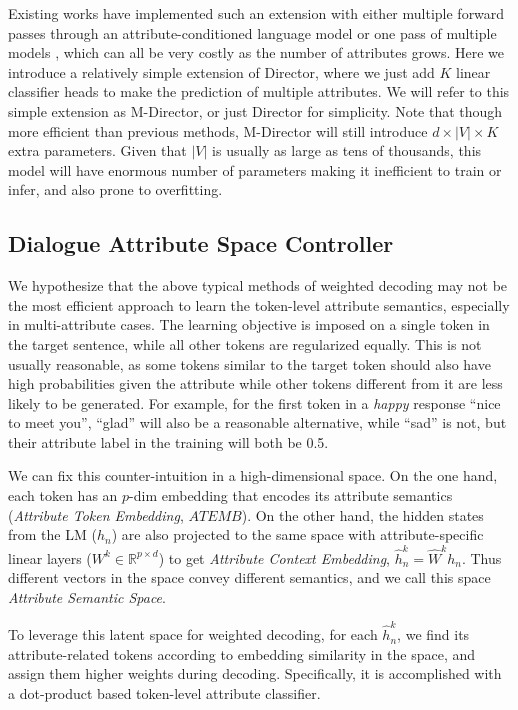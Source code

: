 Existing works have implemented such an extension with either multiple forward passes through an 
attribute-conditioned language model \citep{lin2021plug} or one pass 
of multiple models \citep{liu2021dexperts}, which can all be very costly as the number of attributes grows. 
Here we introduce a relatively simple extension of Director, where we just add $K$ linear classifier heads to 
make the prediction of multiple attributes. We will refer to this 
simple extension as M-Director, or just Director for simplicity.
Note that though more efficient than previous methods, M-Director will still introduce $d \times |V| \times K$ extra parameters.
Given that $|V|$ is usually as large as tens of thousands, this model will 
have enormous number of parameters making it inefficient to train or infer, 
and also prone to overfitting. 

\subsection{Dialogue Attribute Space Controller}
\label{sec:dasc_method}
We hypothesize that the above typical methods of weighted decoding may 
not be the most efficient approach to learn the token-level attribute 
semantics, especially in multi-attribute cases. 
The learning objective is imposed on a single token in the target sentence, 
while all  other tokens are regularized equally. This is not usually reasonable, as some tokens similar to the target token should also have high probabilities 
given the attribute while other tokens different from it are less likely to be 
generated. For example, for the first token in a \textit{happy} response ``nice to meet you'', ``glad'' will also be a reasonable alternative, 
while ``sad'' is not, but their attribute label in the training will both 
be 0.5.

We can fix this counter-intuition in a high-dimensional space. 
On the one hand, each token has an $p$-dim embedding that encodes its attribute 
semantics (\textit{Attribute Token Embedding}, $ATEMB$). 
On the other hand, the hidden states from the LM ($h_n$) are also projected 
to the same space with attribute-specific linear layers 
($W^k \in \mathbb{R}^{p \times d}$) to get 
\textit{Attribute Context Embedding}, $\hat h^k_n = \hat W^k h_n$.
Thus different vectors in the space convey different semantics, 
and we call this space \textit{Attribute Semantic Space}. 

To leverage this latent space for weighted decoding, for each $\hat h^k_n$, we find its attribute-related tokens according to embedding similarity in the space, and assign them higher weights during decoding. Specifically, it is accomplished with a dot-product based token-level attribute classifier.


